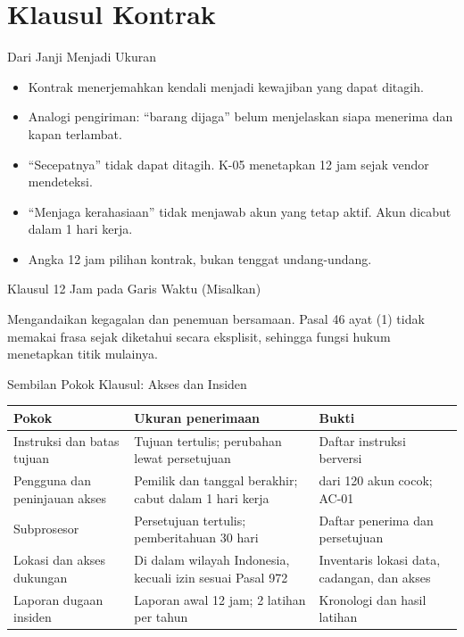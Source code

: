 \documentclass[aspectratio=169, table, 12pt]{beamer}
\begin{document}
\section{Klausul Kontrak}

\begin{frame}{{\Large Dari Janji Menjadi Ukuran}}
  \vspace{6pt}
  \small
  \begin{itemize}
    \item Kontrak menerjemahkan kendali menjadi kewajiban yang dapat ditagih.
    \item Analogi pengiriman: ``barang dijaga'' belum menjelaskan siapa menerima dan kapan
          terlambat.
    \item ``Secepatnya'' tidak dapat ditagih. K-05 menetapkan 12 jam sejak vendor mendeteksi.
    \item ``Menjaga kerahasiaan'' tidak menjawab akun yang tetap aktif. Akun dicabut dalam 1 hari
          kerja.
    \item Angka 12 jam pilihan kontrak, bukan tenggat undang-undang.
  \end{itemize}
\end{frame}

\begin{frame}{{\Large Klausul 12 Jam pada Garis Waktu (Misalkan)}}
  \vspace{6pt}
  \begin{center}
    \resizebox{0.92\textwidth}{!}{}
  \end{center}
  \footnotesize Mengandaikan kegagalan dan penemuan bersamaan. Pasal 46 ayat (1) tidak memakai frasa
  sejak diketahui secara eksplisit, sehingga fungsi hukum menetapkan titik mulainya.
\end{frame}

\begin{frame}{{\Large Sembilan Pokok Klausul: Akses dan Insiden}}
  \vspace{2pt}
  \scriptsize
  \begin{tabularx}{\textwidth}{|>{\raggedright\arraybackslash}p{}|>{\raggedright\arraybackslash}X|>{\raggedright\arraybackslash}X|}
    \hline
    \textbf{Pokok} & \textbf{Ukuran penerimaan} & \textbf{Bukti} \\ \hline
    Instruksi dan batas tujuan & Tujuan tertulis; perubahan lewat persetujuan & Daftar instruksi
    berversi \\ \hline
    Pengguna dan peninjauan akses & Pemilik dan tanggal berakhir; cabut dalam 1 hari kerja & 120
    dari 120 akun cocok; AC-01 \\ \hline
    Subprosesor & Persetujuan tertulis; pemberitahuan 30 hari & Daftar penerima dan persetujuan \\
    \hline
    Lokasi dan akses dukungan & Di dalam wilayah Indonesia, kecuali izin sesuai Pasal 972 &
    Inventaris lokasi data, cadangan, dan akses \\ \hline
    Laporan dugaan insiden & Laporan awal 12 jam; 2 latihan per tahun & Kronologi dan hasil latihan
    \\ \hline
  \end{tabularx}
\end{frame}
\end{document}
